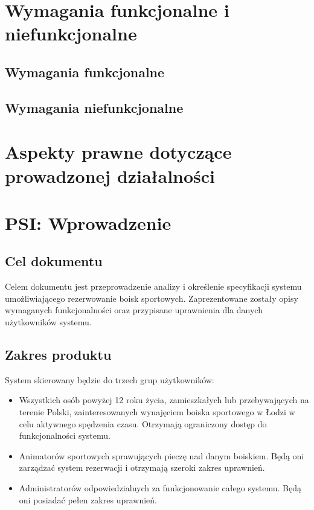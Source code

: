 \documentclass[a4paper,11pt]{article}
\begin{document}
\section{Wymagania funkcjonalne i niefunkcjonalne}

\subsection{Wymagania funkcjonalne}

\subsection{Wymagania niefunkcjonalne}

\section{Aspekty prawne dotyczące prowadzonej działalności}

\newpage

\newpage
\section {PSI: Wprowadzenie}

\subsection {Cel dokumentu}
Celem dokumentu jest przeprowadzenie analizy i określenie specyfikacji systemu umożliwiającego rezerwowanie boisk sportowych. Zaprezentowane zostały opisy wymaganych funkcjonalności oraz przypisane uprawnienia dla danych użytkowników systemu.

\subsection {Zakres produktu}
System skierowany będzie do trzech grup użytkowników:
\begin{itemize}
	\item Wszystkich osób powyżej 12 roku życia, zamieszkałych lub przebywających na terenie Polski, zainteresowanych wynajęciem boiska sportowego w Łodzi w celu aktywnego spędzenia czasu. Otrzymają ograniczony dostęp do funkcjonalności systemu.
	\item Animatorów sportowych sprawujących pieczę nad danym boiskiem. Będą oni zarządzać system rezerwacji i otrzymają szeroki zakres uprawnień.
	\item Administratorów odpowiedzialnych za funkcjonowanie całego systemu. Będą oni posiadać pełen zakres uprawnień.
\end{itemize}
\end{document}
